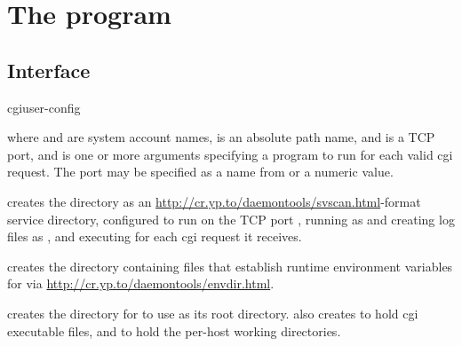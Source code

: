 \documentclass{book}
\begin{document}
\section{The  program}

\subsection{Interface}
\begin{code}
  cgiuser-config     
\end{code}
where  and  are system account names,
 is an absolute path name, and  is a TCP port,
and  is one or more arguments specifying a program to run
for each valid cgi request.  The port may be specified as a name from
 or a numeric value.

 creates the directory  as an
\href{svscan}{http://cr.yp.to/daemontools/svscan.html}-format service
directory, configured to run  on the TCP port
, running  as  and creating log
files as , and executing  for each cgi
request it receives.

 creates the directory 
containing files that establish runtime environment variables for
 via \href{envdir}{http://cr.yp.to/daemontools/envdir.html}.

 creates the directory  for
 to use as its root directory.   also
creates  to hold cgi executable files, and
 to hold the per-host working directories.
\end{document}
